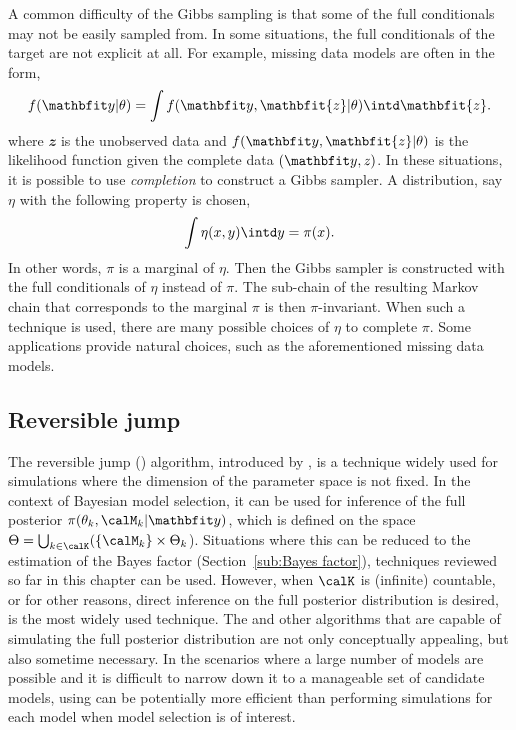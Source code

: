 A common difficulty of the Gibbs sampling is that some of the full conditionals may not be easily sampled from. In some situations, the full conditionals of the target are not explicit at all. For example, missing data models are often in the form,
\begin{equation*}
  f(\data|\theta) = \int f(\data, \mathbfit{z}|\theta)\intd \mathbfit{z}.
\end{equation*}
where $\mathbfit{z}$ is the unobserved data and $f(\data,\mathbfit{z}|\theta)$ is the likelihood function given the complete data $(\data,\mathit{z})$. In these situations, it is possible to use \emph{completion} to construct a Gibbs sampler. A distribution, say $\eta$ with the following property is chosen,
\begin{equation}
  \int\eta(x,y)\intd y = \pi(x).
\end{equation}
In other words, $\pi$ is a marginal of $\eta$. Then the Gibbs sampler is constructed with the full conditionals of $\eta$ instead of $\pi$. The sub-chain of the resulting Markov chain that corresponds to the marginal $\pi$ is then $\pi$-invariant. When such a technique is used, there are many possible choices of $\eta$ to complete $\pi$. Some applications provide natural choices, such as the aforementioned missing data models.

\subsection{Reversible jump \protect\mcmc}
\label{sub:Reversible jump mcmc}

The reversible jump \mcmc (\rjmcmc) algorithm, introduced by \cite{Green:1995dg}, is a technique widely used for simulations where the dimension of the parameter space is not fixed. In the context of Bayesian model selection, it can be used for inference of the full posterior $\pi(\theta_k,\calM_k|\data)$, which is defined on the space $\Theta = \bigcup_{k\in\calK}(\{\calM_k\}\times\Theta_k$). Situations where this can be reduced to the estimation of the Bayes factor (Section~\ref{sub:Bayes factor}), techniques reviewed so far in this chapter can be used. However, when $\calK$ is (infinite) countable, or for other reasons, direct inference on the full posterior distribution is desired, \rjmcmc is the most widely used technique. The \rjmcmc and other algorithms that are capable of simulating the full posterior distribution are not only conceptually appealing, but also sometime necessary. In the scenarios where a large number of models are possible and it is difficult to narrow down it to a manageable set of candidate models, using \rjmcmc can be potentially more efficient than performing simulations for each model when model selection is of interest.


